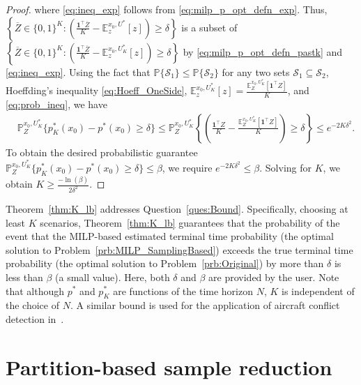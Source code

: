 \documentclass[11pt,letterpaper]{article}
\newcommand{\Prob}{\mathbb{P}}
\newcommand{\Exp}{\mathbb{E}}
\begin{document}
\begin{proof}
		where \eqref{eq:ineq_exp} follows from \eqref{eq:milp_p_opt_defn_exp}.
		Thus, $\left\{ \overline{Z}\in\{0,1\}^K: \left( \frac{\mathbf{1}^\top
        \overline{Z}}{K} - \Exp_z^{x_0,U^\ast}\left[  z \right]\right)\geq
    \delta\right\}$ is  a subset of\\$\left\{\overline{Z}\in\{0,1\}^K: \left( \frac{\mathbf{1}^\top \overline{Z}}{K}  - \Exp_z^{x_0,U^\ast_K}\left[  z \right]\right)\geq \delta\right\} $ by \eqref{eq:milp_p_opt_defn_pastk} and \eqref{eq:ineq_exp}.
		Using the fact that $\Prob\{ \mathcal{S}_1\}\leq \Prob\{ \mathcal{S}_2\}$ for any two sets $ \mathcal{S}_1\subseteq \mathcal{S}_2$, Hoeffding's inequality \eqref{eq:Hoeff_OneSide}, $\Exp_z^{x_0,U^\ast_K}\left[  z \right]=\frac{\Exp_Z^{x_0,U^\ast_K}\left[  \mathbf{1}^\top Z \right]}{K}$, and \eqref{eq:prob_ineq}, we have
		\begin{align}
		&\Prob_{Z}^{x_0, U^\ast_K}\{ p_{K}^{\ast}(x_0)-p^\ast(x_0) \geq \delta\} \leq\Prob_{Z}^{x_0, U^\ast_K}\left\{\left( \frac{\mathbf{1}^\top Z}{K} - \frac{\Exp_Z^{x_0,U^\ast_K}\left[  \mathbf{1}^\top Z \right]}{K} \right) \geq \delta\right\}\leq e^{-2K\delta^2}. \nonumber
		\end{align}
		To obtain the desired probabilistic guarantee $\Prob_{Z}^{x_0, U^\ast_K}\{ p_{K}^{\ast}(x_0)-p^\ast(x_0) \geq \delta\} \leq\beta$, we require $e^{-2K\delta^2}\leq \beta$.
		Solving for $K$, we obtain $K\geq \frac{-\ln(\beta)}{2\delta^2}$.
	\end{proof}
	
	Theorem~\ref{thm:K_lb} addresses Question~\ref{ques:Bound}.
	Specifically,   choosing at least $K$  scenarios, Theorem~\ref{thm:K_lb} guarantees that the probability of the event that the MILP-based estimated terminal  time probability (the optimal solution to Problem~\ref{prb:MILP_SamplingBased}) exceeds the true terminal time probability (the optimal solution to Problem~\ref{prb:Original}) by more than $\delta$ is less than $\beta$ (a small value). Here, both $\delta$ and $\beta$ are provided by the user. Note that although $p^{\ast}$ and $p_{K}^{\ast}$ are functions of the time horizon $N$, $K$ is independent of the choice of $N$.
    A similar bound is used for the application of aircraft conflict detection in~\cite{prandini2000probabilistic}.
	
	
	\section{Partition-based sample reduction}  
	\label{sec:Methodology}
	
\end{document}

